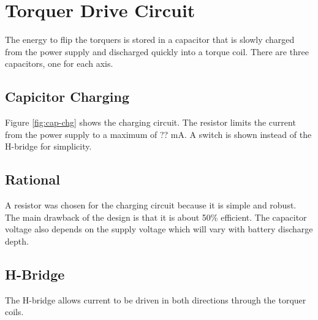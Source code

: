 
\chapter{Torquer Drive Circuit}

The energy to flip the torquers is stored in a capacitor that is slowly charged from the power supply and discharged quickly into a torque coil. There are three capacitors, one for each axis. 

\section{Capicitor Charging}

Figure \cref{fig:cap-chg} shows the charging circuit. The resistor limits the current from the power supply to a maximum of ?? mA. A switch is shown instead of the H-bridge for simplicity.

\section{Rational}

A resistor was chosen for the charging circuit because it is simple and robust. The main drawback of the design is that it is about 50\% efficient. The capacitor voltage also depends on the supply voltage which will vary with battery discharge depth. 

\section{H-Bridge}

The H-bridge allows current to be driven in both directions through the torquer coils. 


